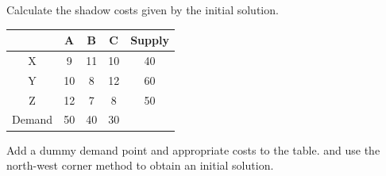 \documentclass[a4paper]{article}
\begin{document}
\begin{eg}
	Calculate the shadow costs given by the initial solution.
	\begin{center}
		\begin{tabular}{|c|c|c|c|c|}
			\hline
			       & A  & B  & C  & Supply \\
			\hline
			X      & 9  & 11 & 10 & 40     \\
			\hline
			Y      & 10 & 8  & 12 & 60     \\
			\hline
			Z      & 12 & 7  & 8  & 50     \\
			\hline
			Demand & 50 & 40 & 30 &        \\
			\hline
		\end{tabular}
	\end{center}
	Add a dummy demand point and appropriate costs to the table.
	and use the north-west corner method to obtain an initial solution.


\end{eg}
\end{document}
